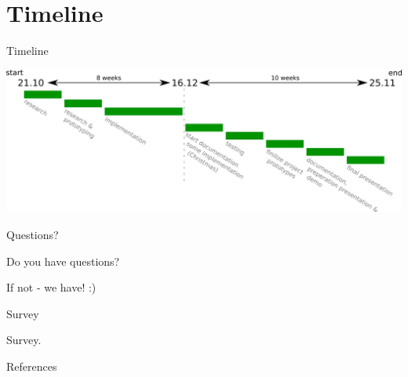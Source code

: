 \documentclass[9pt]{beamer}
\begin{document}
\section{Timeline}

\begin{frame}{Timeline}

	\begin{center}
		
		\includegraphics[width=\textwidth]{Timeline}%

	\end{center}

\end{frame}

\begin{frame}{Questions?}

	\begin{center}

		{\Huge Do you have questions?}
		
		\vspace{1cm}
		
		{\Large If not - we have! :)}
		
	\end{center}

\end{frame}

\begin{frame}{Survey}

	\begin{center}

		Survey.
		
	\end{center}

\end{frame}


\begin{frame}[allowframebreaks]{References}

	

\end{frame}
\end{document}
